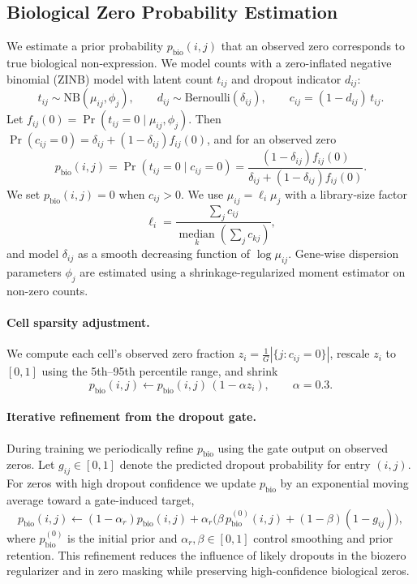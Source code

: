 \documentclass[sigconf,review]{acmart}
\theoremstyle{plain}
\theoremstyle{definition}
\theoremstyle{remark}
\begin{document}
\subsection{Biological Zero Probability Estimation}
\label{sec:biozero}
We estimate a prior probability $p_{\mathrm{bio}}(i,j)$ that an observed zero
corresponds to true biological non-expression. We model counts with a
zero-inflated negative binomial (ZINB) model with latent count $t_{ij}$ and
dropout indicator $d_{ij}$:
\[
t_{ij} \sim \mathrm{NB}(\mu_{ij},\phi_j),\qquad
d_{ij} \sim \mathrm{Bernoulli}(\delta_{ij}),\qquad
c_{ij} = (1-d_{ij})\,t_{ij}.
\]
Let $f_{ij}(0)=\Pr(t_{ij}=0\mid \mu_{ij},\phi_j)$. Then
$\Pr(c_{ij}=0)=\delta_{ij}+(1-\delta_{ij})f_{ij}(0)$, and for an observed zero
\[
p_{\mathrm{bio}}(i,j)=\Pr(t_{ij}=0\mid c_{ij}=0)
=\frac{(1-\delta_{ij})f_{ij}(0)}{\delta_{ij}+(1-\delta_{ij})f_{ij}(0)}.
\]
We set $p_{\mathrm{bio}}(i,j)=0$ when $c_{ij}>0$. We use
$\mu_{ij}=\ell_i\mu_j$ with a library-size factor
\[
\ell_i=\frac{\sum_j c_{ij}}{\operatorname*{median}_k\left(\sum_j c_{kj}\right)},
\]
and model $\delta_{ij}$ as a smooth decreasing function of $\log \mu_{ij}$.
Gene-wise dispersion parameters $\phi_j$ are estimated using a shrinkage-regularized
moment estimator on non-zero counts.

\paragraph{Cell sparsity adjustment.}
We compute each cell's observed zero fraction
$z_i=\frac{1}{G}\left|\{j: c_{ij}=0\}\right|$, rescale $z_i$ to $[0,1]$ using the
5th--95th percentile range, and shrink
\[
p_{\mathrm{bio}}(i,j)\leftarrow p_{\mathrm{bio}}(i,j)\,(1-\alpha z_i),\qquad \alpha=0.3.
\]

\paragraph{Iterative refinement from the dropout gate.}
During training we periodically refine $p_{\mathrm{bio}}$ using the gate output
on observed zeros. Let $g_{ij}\in[0,1]$ denote the predicted dropout probability
for entry $(i,j)$. For zeros with high dropout confidence we update
$p_{\mathrm{bio}}$ by an exponential moving average toward a gate-induced target,
\[
p_{\mathrm{bio}}(i,j)\leftarrow (1-\alpha_r)p_{\mathrm{bio}}(i,j)
+\alpha_r\Big(\beta\,p^{(0)}_{\mathrm{bio}}(i,j)+(1-\beta)(1-g_{ij})\Big),
\]
where $p^{(0)}_{\mathrm{bio}}$ is the initial prior and $\alpha_r,\beta\in[0,1]$
control smoothing and prior retention. This refinement reduces the influence of
likely dropouts in the biozero regularizer and in zero masking while preserving
high-confidence biological zeros.
\end{document}
